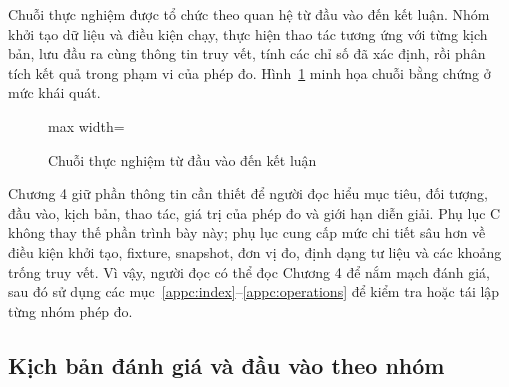 Chuỗi thực nghiệm được tổ chức theo quan hệ từ đầu vào đến kết luận. Nhóm khởi tạo dữ liệu và điều kiện chạy, thực hiện thao tác tương ứng với từng kịch bản, lưu đầu ra cùng thông tin truy vết, tính các chỉ số đã xác định, rồi phân tích kết quả trong phạm vi của phép đo. Hình~\ref{fig:ch4-evaluation-chain} minh họa chuỗi bằng chứng ở mức khái quát.

\begin{figure}[H]
  \centering
  \begin{adjustbox}{max width=\textwidth}
  \end{adjustbox}
  \caption{Chuỗi thực nghiệm từ đầu vào đến kết luận}
  \label{fig:ch4-evaluation-chain}
\end{figure}

Chương 4 giữ phần thông tin cần thiết để người đọc hiểu mục tiêu, đối tượng, đầu vào, kịch bản, thao tác, giá trị của phép đo và giới hạn diễn giải. Phụ lục C không thay thế phần trình bày này; phụ lục cung cấp mức chi tiết sâu hơn về điều kiện khởi tạo, fixture, snapshot, đơn vị đo, định dạng tư liệu và các khoảng trống truy vết. Vì vậy, người đọc có thể đọc Chương 4 để nắm mạch đánh giá, sau đó sử dụng các mục~\ref{appc:index}--\ref{appc:operations} để kiểm tra hoặc tái lập từng nhóm phép đo.

\subsection{Kịch bản đánh giá và đầu vào theo nhóm}

